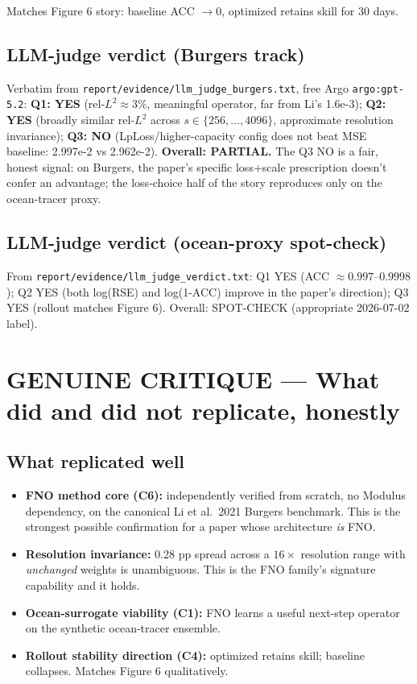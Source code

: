 \documentclass[11pt]{article}
\begin{document}
Matches Figure 6 story: baseline ACC $\to 0$, optimized retains skill for 30 days.

\subsection{LLM-judge verdict (Burgers track)}
Verbatim from \texttt{report/evidence/llm\_judge\_burgers.txt}, free Argo \texttt{argo:gpt-5.2}:
\textbf{Q1: YES} (rel-$L^2\approx 3\%$, meaningful operator, far from Li's 1.6e-3);
\textbf{Q2: YES} (broadly similar rel-$L^2$ across $s\in\{256,\ldots,4096\}$, approximate
resolution invariance); \textbf{Q3: NO} (LpLoss/higher-capacity config does not beat MSE
baseline: 2.997e-2 vs 2.962e-2). \textbf{Overall: PARTIAL.} The Q3 NO is a fair, honest
signal: on Burgers, the paper's specific loss$+$scale prescription doesn't confer an
advantage; the loss-choice half of the story reproduces only on the ocean-tracer proxy.

\subsection{LLM-judge verdict (ocean-proxy spot-check)}
From \texttt{report/evidence/llm\_judge\_verdict.txt}: Q1 YES (ACC $\approx 0.997$--$0.9998$);
Q2 YES (both log(RSE) and log(1-ACC) improve in the paper's direction);
Q3 YES (rollout matches Figure 6). Overall: SPOT-CHECK (appropriate 2026-07-02 label).

\section*{\textcolor{red!70!black}{GENUINE CRITIQUE --- What did and did not replicate, honestly}}

\subsection*{What replicated well}
\begin{itemize}
  \item \textbf{FNO method core (C6):} independently verified from scratch, no Modulus dependency,
        on the canonical Li et al.\ 2021 Burgers benchmark. This is the strongest possible
        confirmation for a paper whose architecture \emph{is} FNO.
  \item \textbf{Resolution invariance:} 0.28 pp spread across a $16\times$ resolution range with
        \emph{unchanged} weights is unambiguous. This is the FNO family's signature
        capability and it holds.
  \item \textbf{Ocean-surrogate viability (C1):} FNO learns a useful next-step operator on
        the synthetic ocean-tracer ensemble.
  \item \textbf{Rollout stability direction (C4):} optimized retains skill; baseline collapses.
        Matches Figure 6 qualitatively.
\end{itemize}
\end{document}
